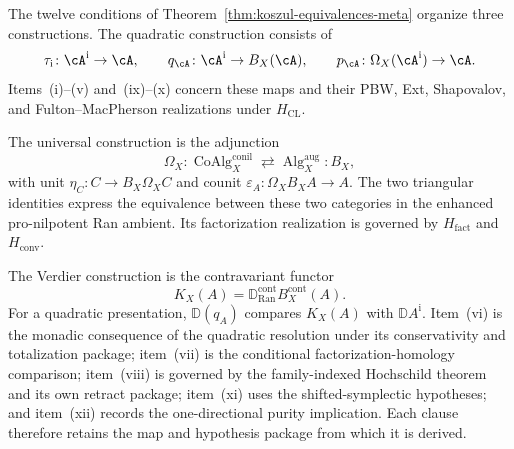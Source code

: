 \begin{remark}
\label{rem:koszul-reflection-orientation}
The twelve conditions of
Theorem~\ref{thm:koszul-equivalences-meta} organize three constructions.
The quadratic construction consists of
\[
\tau_{\mathrm i}\colon\cA^{\mathrm i}\to\cA,
\qquad
q_\cA\colon\cA^{\mathrm i}\to B_X(\cA),
\qquad
p_\cA\colon\Omega_X(\cA^{\mathrm i})\to\cA.
\]
Items~\textup{(i)--(v)} and~\textup{(ix)--(x)} concern these maps and
their PBW, Ext, Shapovalov, and Fulton--MacPherson realizations under
$H_{\mathrm{CL}}$.

The universal construction is the adjunction
\[
\Omega_X\colon\operatorname{CoAlg}^{\mathrm{conil}}_X
\rightleftarrows
\operatorname{Alg}^{\mathrm{aug}}_X:B_X,
\]
with unit $\eta_C\colon C\to B_X\Omega_XC$ and counit
$\varepsilon_A\colon\Omega_XB_XA\to A$.  The two triangular
identities express the equivalence between these two categories in
the enhanced pro-nilpotent Ran ambient.  Its factorization realization
is governed by $H_{\mathrm{fact}}$ and $H_{\mathrm{conv}}$.

The Verdier construction is the contravariant functor
\[
K_X(A)=\mathbb D_{\operatorname{Ran}}^{\mathrm{cont}}B_X^{\mathrm{cont}}(A).
\]
For a quadratic presentation, $\mathbb D(q_A)$ compares $K_X(A)$ with
$\mathbb D A^{\mathrm i}$.  Item~\textup{(vi)} is the monadic
consequence of the quadratic resolution under its conservativity and
totalization package; item~\textup{(vii)} is the conditional
factorization-homology comparison; item~\textup{(viii)} is governed by
the family-indexed Hochschild theorem and its own retract package;
item~\textup{(xi)} uses the shifted-symplectic hypotheses; and
item~\textup{(xii)} records the one-directional purity implication.
Each clause therefore retains the map and hypothesis package from
which it is derived.
\end{remark}

